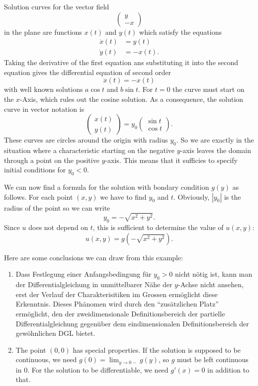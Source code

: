 Solution curves for the vector field
\[
\begin{pmatrix}
y\\-x
\end{pmatrix}
\]
in the plane are functions $x(t)$ and $y(t)$ which satisfy the equations
\begin{align*}
\dot x(t)&=y(t)\\
\dot y(t)&=-x(t).
\end{align*}
Taking the derivative of the first equation ans substituting it into
the second equation gives the differential equation of second order
\[
\ddot x(t)=-x(t)
\]
with well known solutions $a\cos t$ and $b \sin t$.
For $t=0$ the curve must start on the $x$-Axis, which rules out the
cosine solution.
As a consequence, the solution curve in vector notation is
\[
\begin{pmatrix}
x(t)\\y(t)
\end{pmatrix}
=y_0\begin{pmatrix}
\sin t\\
\cos t
\end{pmatrix}.
\]
These curves are circles around the origin with radius $y_0$.
So we are exactly in the situation where a characteristic starting on
the negative $y$-axis leaves the domain through a point on the positive
$y$-axis.
This means that it sufficies to specify initial conditions for $y_0<0$.

We can now find a formula for the solution with bondary condition $g(y)$
as follows.
For each point $(x,y)$ we have to find $y_0$ and $t$.
Obviously, $|y_0|$ is the radius of the point so we can write
\[
y_0 = -\sqrt{x^2+y^2}.
\]
Since $u$ does not depend on $t$, this is sufficient to determine
the value of $u(x,y)$:
\[
u(x,y)=g(-\sqrt{x^2+y^2}).
\]

Here are some conclusions we can draw from this example:
\begin{enumerate}
\item
Dass Festlegung einer Anfangsbedingung für $y_0>0$ nicht nötig ist,
kann man der Differentialgleichung in unmittelbarer Nähe der $y$-Achse nicht
ansehen, erst der Verlauf der Charakterisitiken im Grossen ermöglicht
diese Erkenntnis. Dieses Phänomen wird durch den ``zusätzlichen Platz''
ermöglicht, den der zweidimensionale Definitionsbereich der partielle Differentialgleichung gegenüber dem
eindimensionalen Definitionsbereich der gewöhnlichen DGL bietet.
\item
The point $(0,0)$ has special properties.
If the solution is supposed to be continuous, we need
$g(0)=\lim_{y\to 0-} g(y)$, so $g$ must be left continuous in $0$.
For the solution to be differentiable, we need $g'(x)=0$ in addition
to that.
\end{enumerate}

